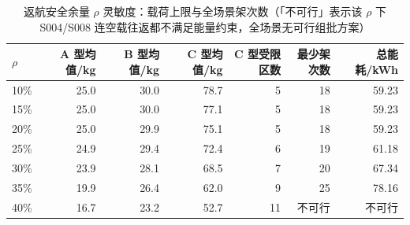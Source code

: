 \begin{table}[htbp]
\centering
\caption{问题一五个具名组批方案的指标对比（累计作业时间为各架次时长之和）}
\label{tab:q1schemes}
\footnotesize
{}
\end{table}

\begin{table}[htbp]
\centering
\caption{返航安全余量 $\rho$ 灵敏度：载荷上限与全场景架次数（「不可行」表示该 $\rho$ 下 S004/S008 连空载往返都不满足能量约束，全场景无可行组批方案）}
\label{tab:rho}
\footnotesize
\begin{tabular}{lrrrrrr}
\toprule
$\rho$ & A 型均值/kg & B 型均值/kg & C 型均值/kg & C 型受限区数 & 最少架次数 & 总能耗/kWh \\
\midrule
10\% & 25.0 & 30.0 & 78.7 & 5 & 18 & 59.23 \\
15\% & 25.0 & 30.0 & 77.1 & 5 & 18 & 59.23 \\
20\% & 25.0 & 29.9 & 75.1 & 5 & 18 & 59.23 \\
25\% & 24.9 & 29.4 & 72.4 & 6 & 19 & 61.18 \\
30\% & 23.9 & 28.1 & 68.5 & 7 & 20 & 67.34 \\
35\% & 19.9 & 26.4 & 62.0 & 9 & 25 & 78.16 \\
40\% & 16.7 & 23.2 & 52.7 & 11 & 不可行 & 不可行 \\
\bottomrule
\end{tabular}
\end{table}

